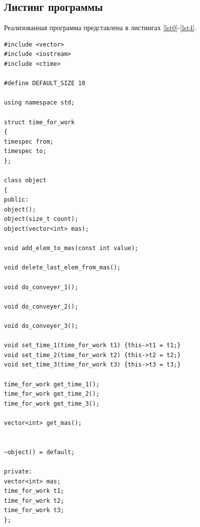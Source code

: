 \documentclass[a4paper,12pt]{article}
\begin{document}
\subsection{Листинг программы}

Реализованная программа представлена
в листингах \ref{lst0}-\ref{lst4}.

\begin{lstlisting}[label=lst0,caption=Структура класса object]
#include <vector>
#include <iostream>
#include <ctime>

#define DEFAULT_SIZE 10

using namespace std;

struct time_for_work
{
timespec from;
timespec to;
};

class object
{
public:
object();
object(size_t count);
object(vector<int> mas);

void add_elem_to_mas(const int value);

void delete_last_elem_from_mas();

void do_conveyer_1();

void do_conveyer_2();

void do_conveyer_3();

void set_time_1(time_for_work t1) {this->t1 = t1;}
void set_time_2(time_for_work t2) {this->t2 = t2;}
void set_time_3(time_for_work t3) {this->t3 = t3;}

time_for_work get_time_1();
time_for_work get_time_2();
time_for_work get_time_3();

vector<int> get_mas();


~object() = default;

private:
vector<int> mas;
time_for_work t1;
time_for_work t2;
time_for_work t3;
};
\end{lstlisting}
\end{document}
